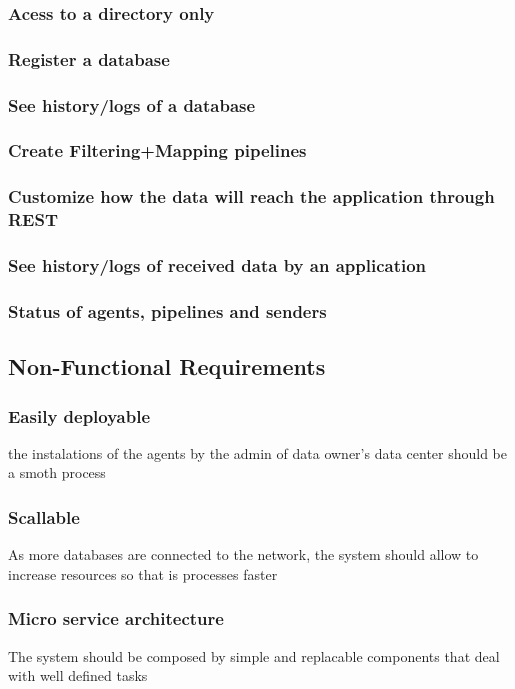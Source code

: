 \subsubsection*{Acess to a directory only}
\subsubsection*{Register a database}
\subsubsection*{See history/logs of a database}
\subsubsection*{Create Filtering+Mapping pipelines}
\subsubsection*{Customize how the data will reach the application through REST}
\subsubsection*{See history/logs of received data by an application}
\subsubsection*{Status of agents, pipelines and senders}

\subsection{Non-Functional Requirements}

\subsubsection*{Easily deployable}
the instalations of the agents by the admin of data owner's data center should be a smoth process

\subsubsection*{Scallable}
As more databases are connected to the network, the system should allow to increase resources so that is processes faster

\subsubsection*{Micro service architecture}
The system should be composed by simple and replacable components that deal with well defined tasks

